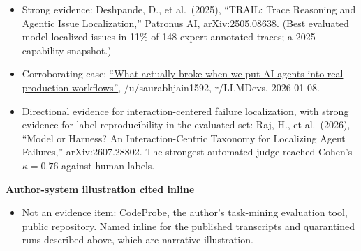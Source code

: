 \begin{itemize}
\tightlist
\item
  Strong evidence: Deshpande, D., et al.~(2025), ``TRAIL: Trace Reasoning and Agentic Issue Localization,'' Patronus AI, arXiv:2505.08638. (Best evaluated model localized issues in 11\% of 148 expert-annotated traces; a 2025 capability snapshot.)
\item
  Corroborating case: \href{https://www.reddit.com/r/LLMDevs/comments/1q7avil/}{``What actually broke when we put AI agents into real production workflows''}, /u/saurabhjain1592, r/LLMDevs, 2026-01-08.
\item
  Directional evidence for interaction-centered failure localization, with strong evidence for label reproducibility in the evaluated set: Raj, H., et al.~(2026), ``Model or Harness? An Interaction-Centric Taxonomy for Localizing Agent Failures,'' arXiv:2607.28802. The strongest automated judge reached Cohen's \(\kappa=0.76\) against human labels.
\end{itemize}

\textbf{Author-system illustration cited inline}

\begin{itemize}
\tightlist
\item
  Not an evidence item: CodeProbe, the author's task-mining evaluation tool, \href{https://github.com/sjarmak/codeprobe}{public repository}. Named inline for the published transcripts and quarantined runs described above, which are narrative illustration.
\end{itemize}
